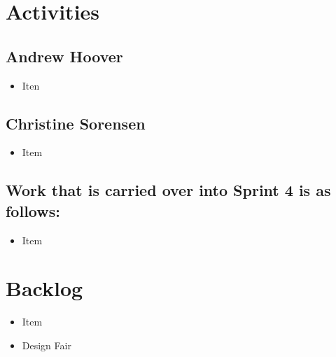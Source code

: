 \documentclass{article}
\begin{document}
\section*{Activities}

\subsection*{Andrew Hoover}
\begin{itemize}
	\item Iten
\end{itemize}
\subsection*{Christine Sorensen}
\begin{itemize}
	\item Item
\end{itemize}

\subsection*{Work that is carried over into Sprint 4 is as follows:}
\begin{itemize}
	\item Item
\end{itemize}

\section*{Backlog}
\begin{itemize}
	\item Item
	\item Design Fair
\end{itemize}
\end{document}
